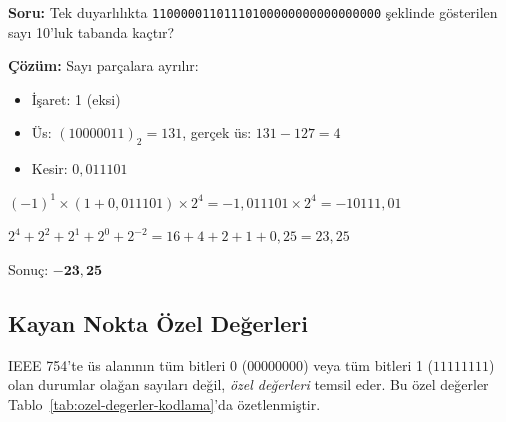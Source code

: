 \begin{ornek}[5.17]
\textbf{Soru:} Tek duyarlılıkta \texttt{11000001101110100000000000000000} şeklinde gösterilen sayı 10'luk tabanda kaçtır?

\textbf{Çözüm:} Sayı parçalara ayrılır:

\begin{center}
\end{center}

\begin{itemize}
\item İşaret: 1 (eksi)
\item Üs: $(10000011)_2 = 131$, gerçek üs: $131 - 127 = 4$
\item Kesir: $0{,}011101$
\end{itemize}

$(-1)^1 \times (1 + 0{,}011101) \times 2^4 = -1{,}011101 \times 2^4 = -10111{,}01$

\begin{center}
$2^4 + 2^2 + 2^1 + 2^0 + 2^{-2} = 16 + 4 + 2 + 1 + 0{,}25 = 23{,}25$
\end{center}

Sonuç: $\mathbf{-23{,}25}$
\end{ornek}

\subsection{Kayan Nokta Özel Değerleri}

IEEE 754'te üs alanının tüm bitleri 0 ($00000000$) veya tüm bitleri 1 ($11111111$) olan durumlar olağan sayıları değil, \emph{özel değerleri} temsil eder. Bu özel değerler Tablo~\ref{tab:ozel-degerler-kodlama}'da özetlenmiştir.

